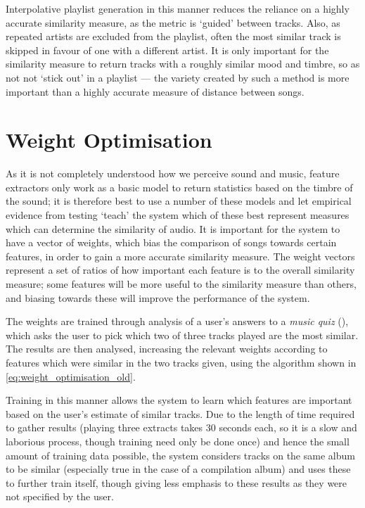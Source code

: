 Interpolative playlist generation in this manner reduces the reliance on a highly accurate similarity measure, as the metric is `guided' between tracks. Also, as repeated artists are excluded from the playlist, often the most similar track is skipped in favour of one with a different artist. It is only important for the similarity measure to return tracks with a roughly similar mood and timbre, so as not not `stick out' in a playlist --- the variety created by such a method is more important than a highly accurate measure of distance between songs.
\section{Weight Optimisation}
\label{text:method:weight_optimisation}
As it is not completely understood how we perceive sound and music, feature extractors only work as a basic model to return statistics based on the timbre of the sound; it is therefore best to use a number of these models and let empirical evidence from testing `teach' the system which of these best represent measures which can determine the similarity of audio. It is important for the system to have a vector of weights, which bias the comparison of songs towards certain features, in order to gain a more accurate similarity measure. The weight vectors represent a set of ratios of how important each feature is to the overall similarity measure; some features will be more useful to the similarity measure than others, and biasing towards these will improve the performance of the system.

The weights are trained through analysis of a user's answers to a \emph{music quiz} (), which asks the user to pick which two of three tracks played are the most similar. The results are then analysed, increasing the relevant weights according to features which were similar in the two tracks given, using the algorithm shown in \ref{eq:weight_optimisation_old}.

Training in this manner allows the system to learn which features are important based on the user's estimate of similar tracks. Due to the length of time required to gather results (playing three extracts takes 30 seconds each, so it is a slow and laborious process, though training need only be done once) and hence the small amount of training data possible, the system considers tracks on the same album to be similar (especially true in the case of a compilation album) and uses these to further train itself, though giving less emphasis to these results as they were not specified by the user.

